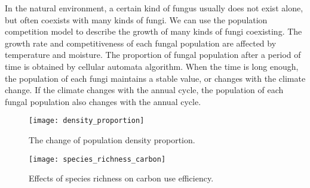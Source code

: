 \documentclass{mcmthesis}
\begin{document}
\begin{appendices}
In the natural environment, a certain kind of fungus usually does not exist alone, but often coexists with many kinds of fungi. We can use the population competition model to describe the growth of many kinds of fungi coexisting. The growth rate and competitiveness of each fungal population are affected by temperature and moisture. The proportion of fungal population after a period of time is obtained by cellular automata algorithm. When the time is long enough, the population of each fungi maintains a stable value, or changes with the climate change. If the climate changes with the annual cycle, the population of each fungal population also changes with the annual cycle.


\begin{figure}[H]
  \centering
  \subfigure
  {
    \begin{minipage}[b]{.4\linewidth}
      \centering
      \texttt{[image: density\_proportion]}
      \caption{The change of population density proportion.}
    \end{minipage}
  }\quad \quad \quad \quad \quad \quad
  \subfigure
  {
    \begin{minipage}[b]{.4\linewidth}
      \centering
      \texttt{[image: species\_richness\_carbon]}
      \caption{Effects of species richness on carbon use efficiency.}
    \end{minipage}
  }
\end{figure}





\end{appendices}
\end{document}
